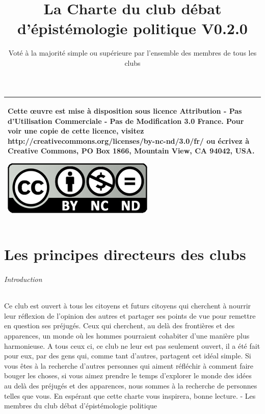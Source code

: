 \documentclass[a4paper,12pt]{article}
\title{\Huge{La Charte du club débat d'épistémologie politique} \LARGE{V0.2.0}}
\author{Voté à la majorité simple ou supérieure par l'ensemble des membres de tous les clubs}
\begin{document}
\maketitle

\begin{tabular}{|p{}|}
 \hline
 Cette œuvre est mise à disposition sous licence Attribution - Pas d’Utilisation Commerciale - Pas de Modification 3.0 France. Pour voir une copie de cette licence, visitez http://creativecommons.org/licenses/by-nc-nd/3.0/fr/ ou écrivez à Creative Commons, PO Box 1866, Mountain View, CA 94042, USA.
 \begin{center}
 \includegraphics[scale=1]{cc.jpg}
 \end{center}\\
 \hline
\end{tabular}
\newpage
\tableofcontents
\newpage

\part{Les principes directeurs des clubs}
\paragraph{Introduction}
Ce club est ouvert à tous les citoyens et futurs citoyens qui cherchent à nourrir leur réflexion de l'opinion des autres et partager ses points de vue pour remettre en question ses préjugés. Ceux qui cherchent, au delà des frontières et des apparences, un monde où les hommes pourraient cohabiter d'une manière plus harmonieuse. A tous ceux ci, ce club ne leur est pas seulement ouvert, il a été fait pour eux, par des gens qui, comme tant d'autres, partagent cet idéal simple. Si vous êtes à la recherche d'autres personnes qui aiment réfléchir à comment faire bouger les choses, si vous aimez prendre le temps d'explorer le monde des idées au delà des préjugés et des apparences, nous sommes à la recherche de personnes telles que vous. En espérant que cette charte vous inspirera, bonne lecture. - Les membres du club débat d'épistémologie politique
\end{document}
